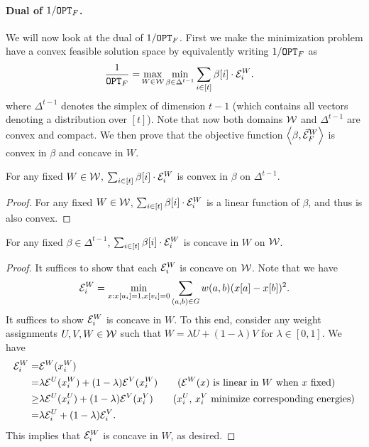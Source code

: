 \documentclass{article}
\begin{document}
\paragraph{Dual of $1/\mathtt{OPT}_F$.}
We will now look at the dual of $1/\mathtt{OPT}_F$.
First we make the minimization problem have a convex feasible solution space
by equivalently writing $1/\mathtt{OPT}_F$ as
\begin{align}\label{eq:primal}
    \frac{1}{\mathtt{OPT}_F} = & \max_{W\in\mathcal{W}} \min_{\beta\in\Delta^{t-1}}
    \sum_{i\in[t]} \beta[i] \cdot \mathcal{E}_i^{W}.
\end{align}
where $\Delta^{t-1}$ denotes the simplex of dimension $t-1$
(which contains all vectors denoting a distribution over $[t]$).
Note that now both domains $\mathcal{W}$ and $\Delta^{t-1}$ are convex and compact.
We then prove that the objective function $\left\langle\beta,\vec{\mathcal{E}}^W_F\right\rangle$ is convex
in $\beta$ and concave in $W$.
\begin{proposition}\label{prop:convex}
    For any fixed $W\in \mathcal{W}$, 
    $\sum_{i\in[t]} \beta[i] \cdot \mathcal{E}_i^{W}$ is convex
    in $\beta$ on $\Delta^{t-1}$.
\end{proposition}
\begin{proof}
    For any fixed $W\in \mathcal{W}$,
    $\sum_{i\in[t]} \beta[i] \cdot \mathcal{E}_i^{W}$ is a linear function of
    $\beta$, and thus is also convex.
\end{proof}
\begin{proposition}\label{prop:concave}
    For any fixed $\beta\in\Delta^{t-1}$,
    $\sum_{i\in[t]} \beta[i] \cdot \mathcal{E}_i^{W}$ is concave in $W$ on $\mathcal{W}$.
\end{proposition}
\begin{proof}
    It suffices to show that each $\mathcal{E}^{W}_i$ is concave on $\mathcal{W}$.
    Note that we have
    \begin{align*}
        \mathcal{E}^W_{i} =
        \min_{x: x[u_i]=1, x[v_i]=0}
        \sum_{(a,b)\in G} w(a,b) (x[a] - x[b])^2.
    \end{align*}
    It suffices to show $\mathcal{E}^W_{i}$ is concave in $W$.
    To this end,
    consider any weight assignments $U, V, W\in\mathcal{W}$ such that
    $W = \lambda U + (1 - \lambda) V$ for $\lambda\in[0,1]$.
    We have
    \begin{align*}
        \mathcal{E}_{i}^{W} = &
        \mathcal{E}^{W}(x^{W}_{i}) \\ =
        & \lambda \mathcal{E}^{U}(x^{W}_{i}) +
        (1 - \lambda) \mathcal{E}^{V}(x^{W}_{i})
        \qquad \text{($\mathcal{E}^W(x)$ is linear in $W$ when $x$ fixed)} \\
        \geq & \lambda \mathcal{E}^{U}(x^{U}_{i}) +
        (1 - \lambda) \mathcal{E}^{V}(x^{V}_{i})
        \qquad \text{($x^{U}_{i}$, $x^{V}_{i}$ minimize
        corresponding energies)} \\
        = & \lambda \mathcal{E}^{U}_{i} + (1 - \lambda) \mathcal{E}^{V}_{i}.
    \end{align*}
    This implies that $\mathcal{E}_{i}^{W}$ is concave in $W$, as desired.
\end{proof}
\end{document}
